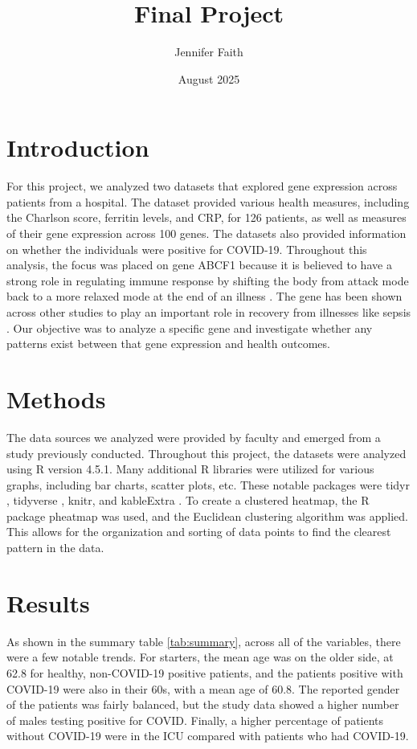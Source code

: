 \documentclass{article}
\title{Final Project}
\author{Jennifer Faith}
\date{August 2025}
\begin{document}
\maketitle
\tableofcontents


\section{Introduction}
For this project, we analyzed two datasets that explored gene expression across patients from a hospital. The dataset provided various health measures, including the Charlson score, ferritin levels, and CRP, for 126 patients, as well as measures of their gene expression across 100 genes. The datasets also provided information on whether the individuals were positive for COVID-19. Throughout this analysis, the focus was placed on gene ABCF1 because it is believed to have a strong role in regulating immune response by shifting the body from attack mode back to a more relaxed mode at the end of an illness \cite{wilcox_role_2017}. The gene has been shown across other studies to play an important role in recovery from illnesses like sepsis \cite{arora_atp-binding_2019}. Our objective was to analyze a specific gene and investigate whether any patterns exist between that gene expression and health outcomes. 
 
\section{Methods}
The data sources we analyzed were provided by faculty and emerged from a study previously conducted. Throughout this project, the datasets were analyzed using R version 4.5.1. Many additional R libraries were utilized for various graphs, including bar charts, scatter plots, etc. These notable packages were tidyr \cite{tidyr2024}, tidyverse \cite{tidyverse2024}, knitr\cite{knitr}, and kableExtra \cite{kableextra}. To create a clustered heatmap, the R package pheatmap \cite{pheatmap} was used, and the Euclidean clustering algorithm was applied. This allows for the organization and sorting of data points to find the clearest pattern in the data.

\section{Results}

As shown in the summary table  \ref{tab:summary}, across all of the variables, there were a few notable trends. For starters, the mean age was on the older side, at 62.8 for healthy, non-COVID-19 positive patients, and the patients positive with COVID-19 were also in their 60s, with a mean age of 60.8. The reported gender of the patients was fairly balanced, but the study data showed a higher number of males testing positive for COVID. Finally, a higher percentage of patients without COVID-19 were in the ICU compared with patients who had COVID-19.
\end{document}
